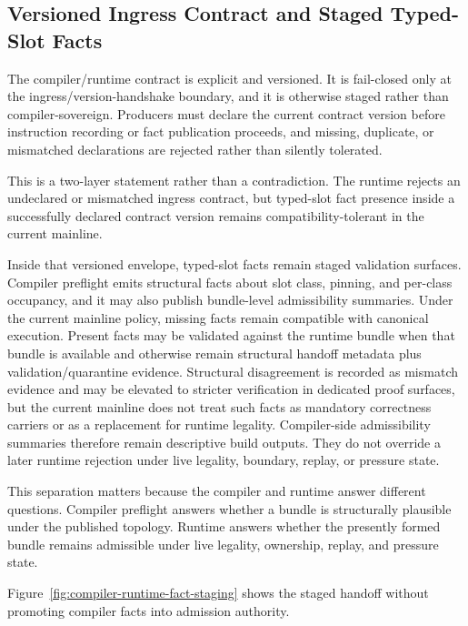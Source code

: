 \documentclass[twocolumn]{article}
\begin{document}
\subsection{Versioned Ingress Contract and Staged Typed-Slot Facts}

The compiler/runtime contract is explicit and versioned. It is fail-closed only at the ingress/version-handshake boundary, and it is otherwise staged rather than compiler-sovereign. Producers must declare the current contract version before instruction recording or fact publication proceeds, and missing, duplicate, or mismatched declarations are rejected rather than silently tolerated.

This is a two-layer statement rather than a contradiction. The runtime rejects an undeclared or mismatched ingress contract, but typed-slot fact presence inside a successfully declared contract version remains compatibility-tolerant in the current mainline.

Inside that versioned envelope, typed-slot facts remain staged validation surfaces. Compiler preflight emits structural facts about slot class, pinning, and per-class occupancy, and it may also publish bundle-level admissibility summaries. Under the current mainline policy, missing facts remain compatible with canonical execution. Present facts may be validated against the runtime bundle when that bundle is available and otherwise remain structural handoff metadata plus validation/quarantine evidence. Structural disagreement is recorded as mismatch evidence and may be elevated to stricter verification in dedicated proof surfaces, but the current mainline does not treat such facts as mandatory correctness carriers or as a replacement for runtime legality. Compiler-side admissibility summaries therefore remain descriptive build outputs. They do not override a later runtime rejection under live legality, boundary, replay, or pressure state.

This separation matters because the compiler and runtime answer different questions. Compiler preflight answers whether a bundle is structurally plausible under the published topology. Runtime answers whether the presently formed bundle remains admissible under live legality, ownership, replay, and pressure state.

Figure~\ref{fig:compiler-runtime-fact-staging} shows the staged handoff without promoting compiler facts into admission authority.


\end{document}
